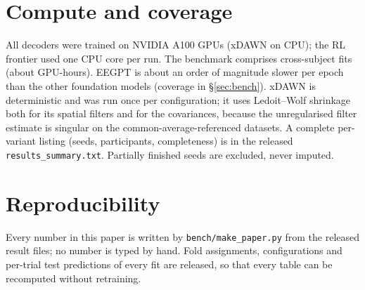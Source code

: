 \section{Compute and coverage}
\label{app:compute}

All decoders were trained on NVIDIA A100 GPUs (xDAWN on CPU); the RL frontier used one CPU core per run.
The benchmark comprises \NFitsTotal{} cross-subject fits (about \GPUHours{} GPU-hours). EEGPT is about an order of magnitude slower per epoch than the other foundation models (coverage in \S\ref{sec:bench}).
xDAWN is deterministic and was run once per configuration; it uses Ledoit--Wolf shrinkage both for its spatial
filters and for the covariances, because the unregularised filter estimate is singular on the
common-average-referenced datasets. A complete per-variant listing (seeds, participants, completeness)
is in the released \texttt{results\_summary.txt}. Partially finished seeds are excluded, never imputed.

\section{Reproducibility}
Every number in this paper is written by \texttt{bench/make\_paper.py} from the released result files;
no number is typed by hand. Fold assignments, configurations and per-trial test predictions of every fit are
released, so that every table can be recomputed without retraining.
